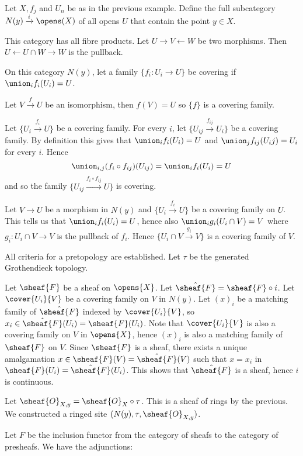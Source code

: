 Let $X,f_j$ and $U_n$ be as in the previous example.
Define the full subcategory $N(y)\xrightarrow{i}\opens(X)$ of all opens $U$ that contain the point $y\in X$.

This category has all fibre products. Let $U\rightarrow V \leftarrow W$ be two morphisms.
Then $U \leftarrow U\cap W \rightarrow W$ is the pullback.

On this category $N(y)$, let a family $\{f_i:U_i\rightarrow U\}$ be covering if $\union_i f_i(U_i) = U$. 

Let $V\xrightarrow{f} U$ be an isomorphism, then $f(V)=U$ so $\{f\}$ is a covering family.

Let $\{U_i \xrightarrow{f_i} U\}$ be a covering family. 
For every $i$, let $\{U_{ij}\xrightarrow{f_{ij}} U_i\}$ be a covering family. 
By definition this gives that $\union_i f_i(U_i)=U$ and $\union_j f_{ij}(U_ij)=U_i$ for every $i$. 
Hence \[\union_{i,j} (f_i \circ f_{ij}) (U_{ij}) = \union_{i} f_i(U_i)=U\] and so the family 
$\{U_{ij}\xrightarrow{f_i \circ f_{ij}} U\}$ is covering.

Let $V\rightarrow U$ be a morphism in $N(y)$ and $\{U_i \xrightarrow{f_i} U\}$ be a covering family on $U$.
This tells us that $\union_i f_i(U_i)=U$, hence also $\union_i g_i(U_i\cap V) = V$ where $g_i:U_i\cap V\rightarrow V$ is the pullback of $f_i$. 
Hence $\{U_i\cap V\xrightarrow{g_i}V\}$ is a covering family of $V$.

All criteria for a pretopology are established. Let $\tau$ be the generated Grothendieck topology.

Let $\sheaf{F}$ be a sheaf on $\opens{X}$.
Let $\hat{\sheaf{F}} = \sheaf{F}\circ i$.
Let $\cover{U_i}{V}$ be a covering family on $V$ in $N(y)$.
Let $(x)_i$ be a matching family of $\hat{\sheaf{F}}$ indexed by $\cover{U_i}{V}$, so $x_i \in \hat{\sheaf{F}}(U_i) = \sheaf{F}(U_i)$.
Note that $\cover{U_i}{V}$ is also a covering family on $V$ in $\opens{X}$, hence $(x)_i$ is also a matching family of $\sheaf{F}$ on $V$.
Since $\sheaf{F}$ is a sheaf, there exists a unique amalgamation $x\in \sheaf{F}(V)=\hat{\sheaf{F}}(V)$ such that $x=x_i$ in $\sheaf{F}(U_i)=\hat{\sheaf{F}}(U_i)$. 
This shows that $\hat{\sheaf{F}}$ is a sheaf, hence $i$ is continuous.

Let $\sheaf{O}_{X,y} = \sheaf{O}_X\circ \tau$. This is a sheaf of rings by the previous.
We constructed a ringed site $(N(y),\tau,\sheaf{O}_{X,y})$.

Let $F$ be the inclusion functor from the category of sheafs to the category of presheafs. 
We have the adjunctions:

